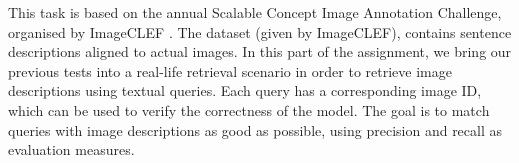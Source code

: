 This task is based on the annual Scalable Concept Image Annotation Challenge, organised by ImageCLEF \cite{imageclef}. The dataset (given by ImageCLEF), contains sentence descriptions aligned to actual images. In this part of the assignment, we bring our previous tests into a real-life retrieval scenario in order to retrieve image descriptions using textual queries. Each query has a corresponding image ID, which can be used to verify the correctness of the model. The goal is to match queries with image descriptions as good as possible, using precision and recall as evaluation measures.

